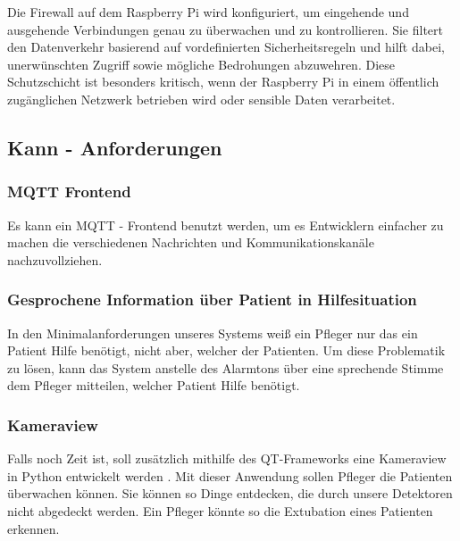 Die Firewall auf dem Raspberry Pi wird konfiguriert, um eingehende und ausgehende Verbindungen genau zu überwachen und zu kontrollieren. Sie filtert den Datenverkehr basierend auf vordefinierten Sicherheitsregeln und hilft dabei, unerwünschten Zugriff sowie mögliche Bedrohungen abzuwehren. Diese Schutzschicht ist besonders kritisch, wenn der Raspberry Pi in einem öffentlich zugänglichen Netzwerk betrieben wird oder sensible Daten verarbeitet.


\subsection{Kann - Anforderungen}

\subsubsection{MQTT Frontend}
Es kann ein MQTT - Frontend benutzt werden, um es Entwicklern einfacher zu machen die verschiedenen Nachrichten und Kommunikationskanäle nachzuvollziehen. 

\subsubsection{Gesprochene Information über Patient in Hilfesituation}
In den Minimalanforderungen unseres Systems weiß ein Pfleger nur das ein Patient Hilfe benötigt, nicht aber, welcher der Patienten. Um diese Problematik zu lösen, kann das System anstelle des Alarmtons über eine sprechende Stimme dem Pfleger mitteilen, welcher Patient Hilfe benötigt. 

\subsubsection{Kameraview}
Falls noch Zeit ist, soll zusätzlich mithilfe des QT-Frameworks eine Kameraview  in Python entwickelt werden \cite{Python} \cite{QT} . Mit dieser Anwendung sollen  Pfleger die Patienten überwachen können. Sie können so Dinge entdecken, die durch unsere Detektoren nicht abgedeckt werden. Ein Pfleger könnte so die Extubation eines Patienten erkennen. 
